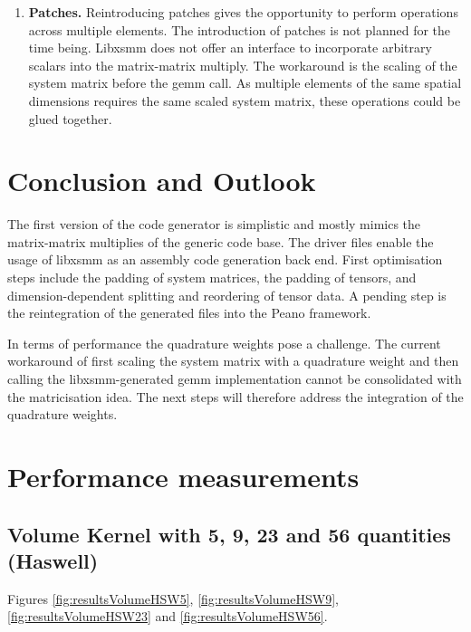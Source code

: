 \documentclass{acm_proc_article-sp}
\begin{document}
\begin{enumerate}
\item \textbf{Patches.} Reintroducing patches gives the opportunity to perform operations across multiple elements. The introduction of patches is not planned for the time being. Libxsmm does not offer an interface to incorporate arbitrary scalars into the matrix-matrix multiply. The workaround is the scaling of the system matrix before the gemm call. As multiple elements of the same spatial dimensions requires the same scaled system matrix, these operations could be glued together.
\end{enumerate}


\section{Conclusion and Outlook}
The first version of the code generator is simplistic and mostly mimics the matrix-matrix multiplies of the generic code base. The driver files enable the usage of libxsmm as an assembly code generation back end. First optimisation steps include the padding of system matrices, the padding of tensors, and dimension-dependent splitting and reordering of tensor data. A pending step is the reintegration of the generated files into the Peano framework.

In terms of performance the quadrature weights pose a challenge. The current workaround of first scaling the system matrix with a quadrature weight and then calling the libxsmm-generated gemm implementation cannot be consolidated with the matricisation idea. The next steps will therefore address the integration of the quadrature weights. 





\newpage
\appendix
\section{Performance measurements} \label{App:Performance measurements}

\subsection{Volume Kernel with 5, 9, 23 and 56 quantities (Haswell)} \label{sec:app1}

Figures \ref{fig:resultsVolumeHSW5}, \ref{fig:resultsVolumeHSW9}, \ref{fig:resultsVolumeHSW23} and \ref{fig:resultsVolumeHSW56}.
\end{document}
